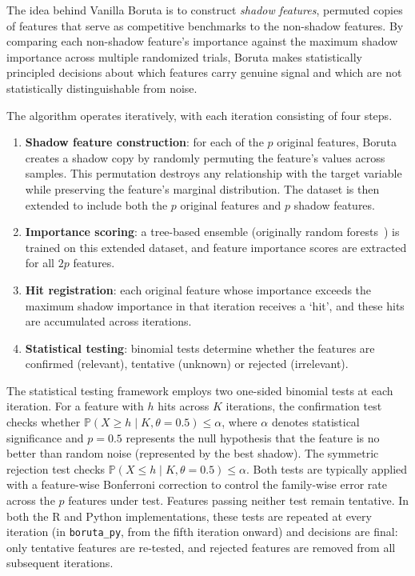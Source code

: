 \documentclass[runningheads]{llncs}
\begin{document}
The idea behind Vanilla Boruta is to construct \emph{shadow features}, permuted copies of features that serve as competitive benchmarks to the non-shadow features. By comparing each non-shadow feature's importance against the maximum shadow importance across multiple randomized trials, Boruta makes statistically principled decisions about which features carry genuine signal and which are not statistically distinguishable from noise.

The algorithm operates iteratively, with each iteration consisting of four steps.
\begin{enumerate}
    \item \textbf{Shadow feature construction}: for each of the $p$ original features, Boruta creates a shadow copy by randomly permuting the feature's values across samples. This permutation destroys any relationship with the target variable while preserving the feature's marginal distribution. The dataset is then extended to include both the $p$ original features and $p$ shadow features. 
    \item \textbf{Importance scoring}: a tree-based ensemble (originally random forests~\cite{breiman2001random}) is trained on this extended dataset, and feature importance scores are extracted for all $2p$ features. 
    \item \textbf{Hit registration}: each original feature whose importance exceeds the maximum shadow importance in that iteration receives a `hit', and these hits are accumulated across iterations. 
    \item \textbf{Statistical testing}: binomial tests determine whether the features are confirmed (relevant), tentative (unknown) or rejected (irrelevant).
\end{enumerate}

The statistical testing framework employs two one-sided binomial tests at each iteration. For a feature with $h$ hits across $K$ iterations, the confirmation test checks whether $\mathbb{P}(X \geq h \mid K, \theta=0.5) \leq \alpha$, where $\alpha$ denotes statistical significance and $p = 0.5$ represents the null hypothesis that the feature is no better than random noise (represented by the best shadow). The symmetric rejection test checks $\mathbb{P}(X \leq h \mid K, \theta=0.5) \leq \alpha$. Both tests are typically applied with a feature-wise Bonferroni correction to control the family-wise error rate across the $p$ features under test. Features passing neither test remain tentative. In both the R and Python implementations, these tests are repeated at every iteration (in \texttt{boruta\_py}, from the fifth iteration onward) and decisions are final: only tentative features are re-tested, and rejected features are removed from all subsequent iterations.
\end{document}
